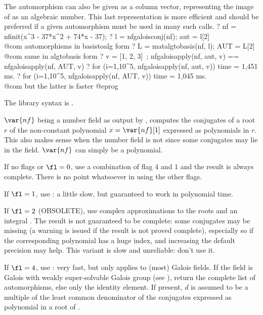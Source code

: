 The automorphism can also be given as a column vector, representing the
image of  as an algebraic number. This last
representation is more efficient and should be preferred if a given
automorphism must be used in many such calls.
\bprog
 ? nf = nfinit(x^3 - 37*x^2 + 74*x - 37);
 ? l = nfgaloisconj(nf); aut = l[2] \\ @com automorphisms in basistoalg form
 ? L = matalgtobasis(nf, l); AUT = L[2] \\ @com same in algtobasis form
 ? v = [1, 2, 3]~; nfgaloisapply(nf, aut, v) == nfgaloisapply(nf, AUT, v)
 ? for (i=1,10^5, nfgaloisapply(nf, aut, v))
 time = 1,451 ms.
 ? for (i=1,10^5, nfgaloisapply(nf, AUT, v))
 time = 1,045 ms.  \\ @com but the latter is faster
@eprog

The library syntax is .

\label{se:nfgaloisconj}
$\var{nf}$ being a number field as output by , computes the
conjugates of a root $r$ of the non-constant polynomial $x=\var{nf}[1]$
expressed as polynomials in $r$. This also makes sense when the number field
is not  since some conjugates may lie in the field.
$\var{nf}$ can simply be a polynomial.

If no flags or $\fl=0$, use a combination of flag $4$ and $1$ and the result
is always complete. There is no point whatsoever in using the other flags.

If $\fl=1$, use : a little slow, but guaranteed to work in
polynomial time.

If $\fl=2$ (OBSOLETE), use complex approximations to the roots and an integral
. The result is not guaranteed to be complete: some
conjugates may be missing (a warning is issued if the result is not proved
complete), especially so if the corresponding polynomial has a huge index,
and increasing the default precision may help. This variant is slow and
unreliable: don't use it.

If $\fl=4$, use : very fast, but only applies to (most) Galois
fields. If the field is Galois with weakly
super-solvable Galois group (see ), return the complete list
of automorphisms, else only the identity element. If present, $d$ is assumed to
be a multiple of the least common denominator of the conjugates expressed as
polynomial in a root of .

